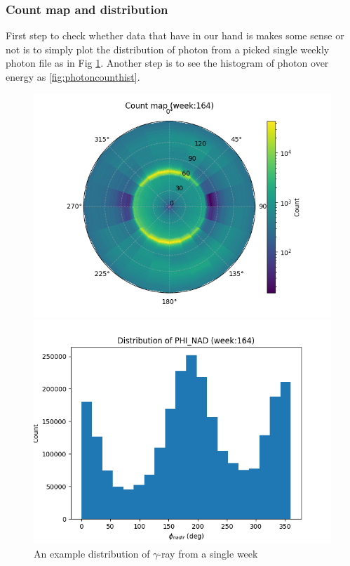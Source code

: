 \subsubsection*{Count map and distribution}

First step to check whether data that have in our hand is makes some sense or not is to simply plot the distribution of photon from a picked single weekly photon file 
as in Fig \ref{fig:exphotondist}. Another step is to see the histogram of photon over energy as \ref{fig:photoncounthist}.

\begin{figure}
    \centering
    \begin{minipage}[b]{0.49\textwidth}
        \centering
        \includegraphics[width=\textwidth]{img/cntmap_polar}
    \end{minipage}
    \begin{minipage}[b]{0.49\textwidth}
        \centering
        \includegraphics[width=\textwidth]{img/phi_nad_dist}
    \end{minipage}
    \caption{An example distribution of $\gamma$-ray from a single week}
    \label{fig:exphotondist}
\end{figure}


